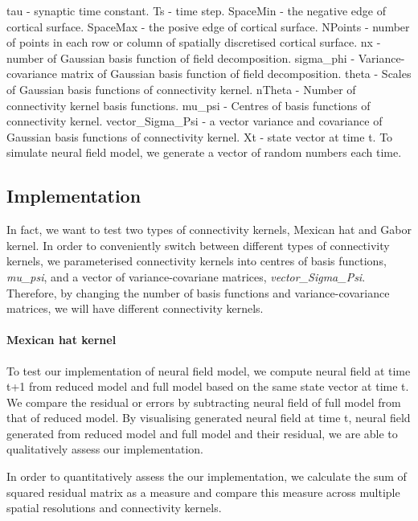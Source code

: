 \documentclass[a4paper, 12pt, english]{article}
\begin{document}
tau - synaptic time constant.\newline
Ts - time step.\newline
SpaceMin - the negative edge of cortical surface.\newline
SpaceMax - the posive edge of cortical surface.\newline
NPoints - number of points in each row or column of spatially discretised cortical surface.\newline
nx - number of Gaussian basis function of field decomposition.\newline
sigma\_phi - Variance-covariance matrix of Gaussian basis function of field decomposition.\newline
theta - Scales of Gaussian basis functions of connectivity kernel.\newline
nTheta - Number of connectivity kernel basis functions.\newline
mu\_psi - Centres of basis functions of connectivity kernel.\newline
vector\_Sigma\_Psi - a vector variance and covariance of Gaussian basis functions of connectivity kernel.\newline
Xt - state vector at time t.
To simulate neural field model, we generate a vector of random numbers each time.

\subsection{Implementation}
In fact, we want to test two types of connectivity kernels, Mexican hat and Gabor kernel.
In order to conveniently switch between different types of connectivity kernels,
we parameterised connectivity kernels into centres of basis functions, \textit{mu\_psi},
and a vector of variance-covariane matrices, \textit{vector\_Sigma\_Psi}.
Therefore, by changing the number of basis functions and variance-covariance matrices,
we will have different connectivity kernels.


\paragraph{Mexican hat kernel\newline}
To test our implementation of neural field model, we compute neural field at time
t+1 from reduced model and full model based on the same state vector at time t.
We compare the residual or errors by subtracting neural field of full model
from that of reduced model. By visualising generated neural field at time t,
neural field generated from reduced model and full model and their residual,
we are able to qualitatively assess our implementation.\par
In order to quantitatively assess the our implementation, we calculate the sum of squared
residual matrix as a measure and compare this measure
across multiple spatial resolutions and connectivity kernels.
\end{document}
